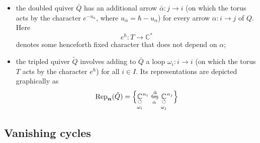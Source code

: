 \documentclass{amsart}
\def\BC{{\mathbb{C}}}
\def\bn{{\boldsymbol{n}}}
\def\dalpha{\bar{\alpha}}
\def\dQ{\bar{Q}}
\def\tQ{\tilde{Q}}
\begin{document}
\begin{itemize}[leftmargin=*]

\item the doubled quiver $\dQ$ has an additional arrow $\dalpha:j \rightarrow i$ (on which the torus acts by the character $e^{-u_{\dalpha}}$, where $u_{\dalpha}=\hbar-u_\alpha$) for every arrow $\alpha : i \rightarrow j$ of $Q$. Here 
$$
e^{\hbar} : T \rightarrow \BC^*
$$
denotes some henceforth fixed character that does not depend on $\alpha$;  

\medskip 

\item the tripled quiver $\tQ$ involves adding to $\dQ$ a loop $\omega_i : i \rightarrow i$ (on which the torus $T$ acts by the character $e^{\hbar}$) for all $i \in I$. Its representations are depicted graphically as
\begin{equation}
\label{eqn:representation tilde}
\text{Rep}_{\bn}(\tQ) = \Big\{\underset{\omega_i}{\underset{\circlearrowleft}{\BC}}^{n_i} \xleftrightharpoons[\alpha]{\dalpha} \underset{\omega_j}{\underset{\circlearrowleft}{\BC}}^{n_j}\Big\}
\end{equation}


\end{itemize}

\medskip 

\subsection{Vanishing cycles} 
\label{sub:vanishing cycles}
\end{document}
